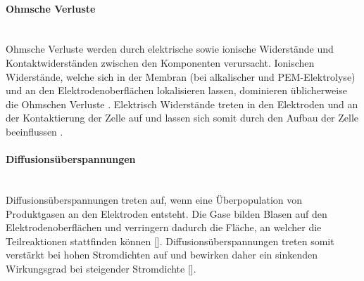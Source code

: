 \paragraph{Ohmsche Verluste} \ \\
Ohmsche Verluste werden durch elektrische sowie ionische Widerstände und Kontaktwiderständen zwischen den Komponenten verursacht. Ionischen Widerstände, welche sich in der Membran (bei alkalischer und PEM-Elektrolyse) und an den Elektrodenoberflächen lokalisieren lassen, dominieren üblicherweise die Ohmschen Verluste \cite{Solid Oxide Electrolyzer Cell Modeling: A Review}. Elektrisch Widerstände treten in den Elektroden und an der Kontaktierung der Zelle auf und lassen sich somit durch den Aufbau der Zelle beeinflussen \cite{ISBN 978-3-95806-217-7}.\\

\paragraph{Diffusionsüberspannungen}\ \\
Diffusionsüberspannungen treten auf, wenn eine Überpopulation von Produktgasen an den Elektroden entsteht. Die Gase bilden Blasen auf den Elektrodenoberflächen und verringern dadurch die Fläche, an welcher die Teilreaktionen stattfinden können [\cite{Modelling and simulation of a proton exchange
membrane (PEM) electrolyser cell}]. Diffusionsüberspannungen treten somit verstärkt bei hohen Stromdichten auf und bewirken daher ein sinkenden Wirkungsgrad bei steigender Stromdichte [\cite{A semiempirical study of the temperature dependence
of the anode charge transfer coefficient of a 6 kW PEM
electrolyzer}].\\

